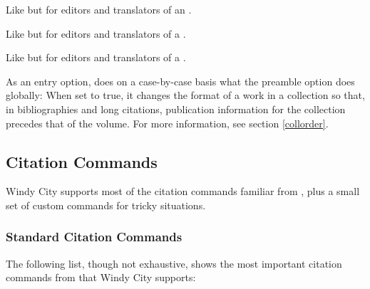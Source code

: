 \documentclass[11pt,letterpaper,oneside]{article}
\begin{document}
\begin{optionlist}

Like  but for editors and translators of an
.


Like  but for editors and translators of a
.


Like  but for editors and translators of a
.


\noindent As an entry option,  does on a case-by-case
basis what the  preamble option does globally: When set
to true, it changes the format of a work in a collection so that, in
bibliographies and long citations, publication information for the
collection precedes that of the volume. For more information, see
section \ref{collorder}.

\end{optionlist}

\subsection{Citation Commands}

Windy City supports most of the citation commands familiar from
\biblatex, plus a small set of custom commands for tricky situations.

\subsubsection{Standard Citation Commands}
\label{std.cmd}

The following list, though not exhaustive, shows the most important
citation commands from \biblatex that Windy City supports:
\end{document}
